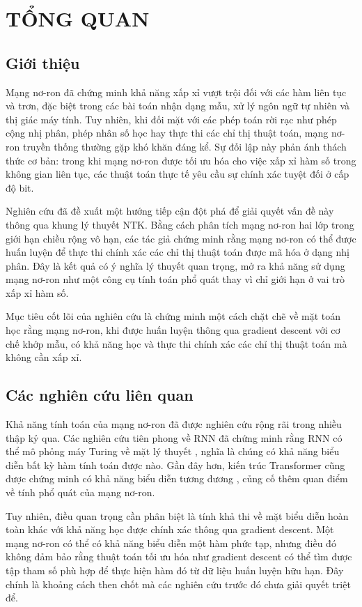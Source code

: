 \chapter{TỔNG QUAN}

\section{Giới thiệu}

Mạng nơ-ron đã chứng minh khả năng xấp xỉ vượt trội đối với các hàm liên tục và trơn, đặc biệt trong các bài toán nhận dạng mẫu, xử lý ngôn ngữ tự nhiên và thị giác máy tính. Tuy nhiên, khi đối mặt với các phép toán rời rạc như phép cộng nhị phân, phép nhân số học hay thực thi các chỉ thị thuật toán, mạng nơ-ron truyền thống thường gặp khó khăn đáng kể. Sự đối lập này phản ánh thách thức cơ bản: trong khi mạng nơ-ron được tối ưu hóa cho việc xấp xỉ hàm số trong không gian liên tục, các thuật toán thực tế yêu cầu sự chính xác tuyệt đối ở cấp độ bit.

Nghiên cứu đã đề xuất một hướng tiếp cận đột phá để giải quyết vấn đề này thông qua khung lý thuyết NTK. Bằng cách phân tích mạng nơ-ron hai lớp trong giới hạn chiều rộng vô hạn, các tác giả chứng minh rằng mạng nơ-ron có thể được huấn luyện để thực thi chính xác các chỉ thị thuật toán được mã hóa ở dạng nhị phân. Đây là kết quả có ý nghĩa lý thuyết quan trọng, mở ra khả năng sử dụng mạng nơ-ron như một công cụ tính toán phổ quát thay vì chỉ giới hạn ở vai trò xấp xỉ hàm số.

Mục tiêu cốt lõi của nghiên cứu là chứng minh một cách chặt chẽ về mặt toán học rằng mạng nơ-ron, khi được huấn luyện thông qua gradient descent với cơ chế khớp mẫu, có khả năng học và thực thi chính xác các chỉ thị thuật toán mà không cần xấp xỉ.

\section{Các nghiên cứu liên quan}

Khả năng tính toán của mạng nơ-ron đã được nghiên cứu rộng rãi trong nhiều thập kỷ qua. Các nghiên cứu tiên phong về RNN đã chứng minh rằng RNN có thể mô phỏng máy Turing về mặt lý thuyết \cite{siegelmann_sontag_1995}, nghĩa là chúng có khả năng biểu diễn bất kỳ hàm tính toán được nào. Gần đây hơn, kiến trúc Transformer cũng được chứng minh có khả năng biểu diễn tương đương \cite{perez_2021}, củng cố thêm quan điểm về tính phổ quát của mạng nơ-ron.

Tuy nhiên, điều quan trọng cần phân biệt là tính khả thi về mặt biểu diễn hoàn toàn khác với khả năng học được chính xác thông qua gradient descent. Một mạng nơ-ron có thể có khả năng biểu diễn một hàm phức tạp, nhưng điều đó không đảm bảo rằng thuật toán tối ưu hóa như gradient descent có thể tìm được tập tham số phù hợp để thực hiện hàm đó từ dữ liệu huấn luyện hữu hạn. Đây chính là khoảng cách then chốt mà các nghiên cứu trước đó chưa giải quyết triệt để.

